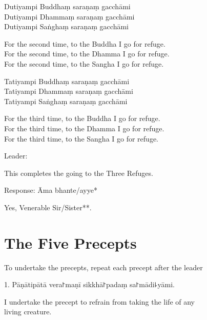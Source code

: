Dutiyampi Buddhaṃ saraṇaṃ gacchāmi\\
Dutiyampi Dhammaṃ saraṇaṃ gacchāmi\\
Dutiyampi Saṅghaṃ saraṇaṃ gacchāmi

\begin{english}
  For the second time, to the Buddha I go for refuge.\\
  For the second time, to the Dhamma I go for refuge.\\
  For the second time, to the Sangha I go for refuge.
\end{english}

Tatiyampi Buddhaṃ saraṇaṃ gacchāmi\\
Tatiyampi Dhammaṃ saraṇaṃ gacchāmi\\
Tatiyampi Saṅghaṃ saraṇaṃ gacchāmi

\begin{english}
  For the third time, to the Buddha I go for refuge.\\
  For the third time, to the Dhamma I go for refuge.\\
  For the third time, to the Sangha I go for refuge.
\end{english}

\begin{leader}
  Leader:\\
  [Tisaraṇa-gamanaṃ niṭṭhitaṃ]
\end{leader}

\begin{english}
  This completes the going to the Three Refuges.
\end{english}

Response: Āma bhante/ayye*

\begin{english}
  Yes, Venerable Sir/Sister**.
\end{english}

\chapter{The Five Precepts}

\begin{instruction}
  To undertake the precepts, repeat each precept after the leader
\end{instruction}

1. Pāṇātipātā vera꜓maṇī sikkhā꜓padaṃ sa꜓mādi꜕yāmi.

I undertake the precept to refrain from taking the life of any \\
living creature.

